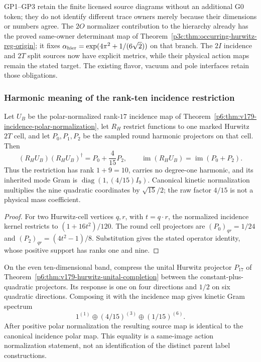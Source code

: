 \documentclass[11pt,a4paper]{article}
\begin{document}
GP1--GP3 retain the finite licensed source diagrams without an additional
G0 token; they do not identify different trace owners merely because their
dimensions or numbers agree.  The \(2O\) normalizer contribution to the
hierarchy already has the proved same-owner determinant map of
Theorem~\ref{p3c:thm:occurring-hurwitz-reg-origin}; it fixes
\(\alpha_{\rm hier}=\exp(4\pi^2+1/(6\sqrt2))\) on that branch.
The \(2I\) incidence and \(2T\) split sources now have explicit metrics,
while their physical action maps remain the stated target.
The existing flavor, vacuum and pole interfaces retain those obligations.


\subsubsection{Harmonic meaning of the rank-ten incidence restriction}
\label{p6:sec:v180-incidence-harmonic-action-bridge}

\begin{theorem}
\label{p6:thm:v180-incidence-harmonic-image}
Let $U_B$ be the polar-normalized rank-$17$ incidence map of
Theorem~\ref{p6:thm:v179-incidence-polar-normalization}, let $R_H$ restrict
functions to one marked Hurwitz $2T$ cell, and let $P_0,P_1,P_2$ be the
sampled round harmonic projectors on that cell.  Then
\[
 \boxed{(R_HU_B)(R_HU_B)^\dagger=P_0+\frac4{15}P_2,\qquad
 \operatorname{im}(R_HU_B)=\operatorname{im}(P_0+P_2).}
\]
Thus the restriction has rank $1+9=10$, carries no degree-one harmonic, and
its inherited mode Gram is $\operatorname{diag}(1,(4/15)I_9)$.  Canonical
kinetic normalization multiplies the nine quadratic coordinates by
$\sqrt{15}/2$; the raw factor $4/15$ is not a physical mass coefficient.
\end{theorem}
\begin{proof}
For two Hurwitz-cell vertices $q,r$, with $t=q\cdot r$, the normalized
incidence kernel restricts to $(1+16t^2)/120$.  The round cell projectors are
$(P_0)_{qr}=1/24$ and $(P_2)_{qr}=(4t^2-1)/8$.  Substitution gives the stated
operator identity, whose positive support has ranks one and nine.
\end{proof}

\begin{corollary}
\label{p6:cor:v180-incidence-hurwitz-polar-identity}
On the even ten-dimensional band, compress the unital Hurwitz projector
$P_{17}$ of Theorem~\ref{p6:thm:v179-hurwitz-unital-completion} between the
constant-plus-quadratic projectors.  Its response is one on four directions
and $1/2$ on six quadratic directions.  Composing it with the incidence map
gives kinetic Gram spectrum
\[
 1^{(1)}\oplus(4/15)^{(3)}\oplus(1/15)^{(6)}.
\]
After positive polar normalization the resulting source map is identical to
the canonical incidence polar map.  This equality is a same-image action
normalization statement, not an identification of the distinct parent label
constructions.
\end{corollary}
\end{document}
